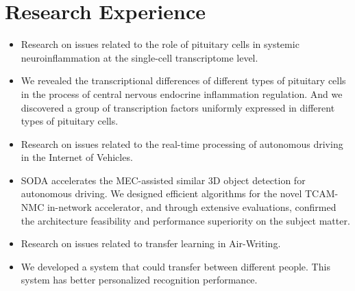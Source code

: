 \documentclass{resume}
\begin{document}
\section{{\bfseries Research Experience}}
\begin{itemize}[parsep=0.2ex]
    \item Research on issues related to the role of pituitary cells in systemic neuroinflammation at the single-cell transcriptome level.
    \item We revealed the transcriptional differences of different types of pituitary cells in the process of central nervous endocrine inflammation regulation. And we discovered a group of transcription factors uniformly expressed in different types of pituitary cells.
\end{itemize}
\begin{itemize}[parsep=0.2ex]
    \item Research on issues related to the real-time processing of autonomous driving in the Internet of Vehicles.
    \item SODA accelerates the MEC-assisted similar 3D object detection for autonomous driving. We designed efficient algorithms for the novel TCAM-NMC in-network accelerator, and through extensive evaluations, confirmed the architecture feasibility and performance superiority on the subject matter.
\end{itemize}
\begin{itemize}[parsep=0.2ex]
    \item Research on issues related to transfer learning in Air-Writing.
    \item We developed a system that could transfer between different people. This system has better personalized recognition performance.
\end{itemize}
\end{document}
